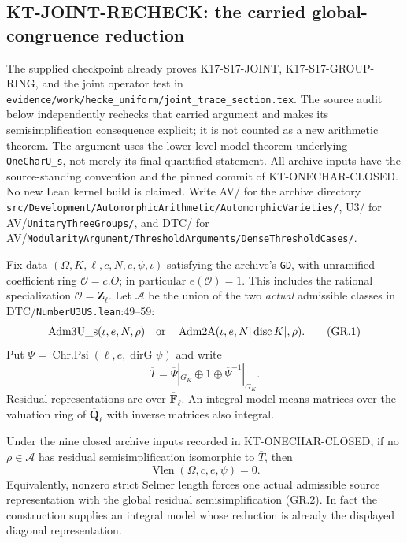 \subsection{KT-JOINT-RECHECK: the carried global-congruence reduction}
\label{sec:kt-global-residual}

The supplied checkpoint already proves K17-S17-JOINT,
K17-S17-GROUP-RING, and the joint operator test in
\texttt{evidence/work/hecke\_uniform/joint\_trace\_section.tex}.
The source audit below independently rechecks that carried
argument and makes its semisimplification consequence explicit;
it is not counted as a new arithmetic theorem. The argument
uses the lower-level model theorem underlying
\texttt{OneCharU\_s}, not merely its final quantified statement.
All archive inputs have the source-standing convention and the
pinned commit of KT-ONECHAR-CLOSED. No new Lean kernel build is
claimed. Write AV/ for the archive directory
\texttt{src/Development/AutomorphicArithmetic/AutomorphicVarieties/},
U3/ for AV/\texttt{UnitaryThreeGroups/}, and DTC/ for
AV/\texttt{ModularityArgument/ThresholdArguments/DenseThresholdCases/}.

Fix data $(\Omega,K,\ell,c,N,e,\psi,\iota)$ satisfying the
archive's \texttt{GD}, with unramified coefficient ring
$\mathcal O=c.O$; in particular $e(\mathcal O)=1$.
This includes the rational specialization $\mathcal O=\mathbf Z_\ell$.
Let $\mathscr A$ be the union of the two \emph{actual} admissible
classes in DTC/\texttt{NumberU3US.lean}:49--59:
\[
 \operatorname{Adm3U\_s}(\iota,e,N,\rho)
 \quad\hbox{or}\quad
 \operatorname{Adm2A}(\iota,e,N|\operatorname{disc}K|,\rho).
                                                               \tag{GR.1}
\]
Put $\Psi=\operatorname{Chr.Psi}(\ell,e,\operatorname{dirG}\psi)$
and write
\[
 \overline T=\overline\Psi|_{G_K}\oplus1
                    \oplus\overline\Psi^{-1}|_{G_K}.
                                                               \tag{GR.2}
\]
Residual representations are over $\overline{\mathbf F}_\ell$.
An integral model means matrices over the valuation ring of
$\overline{\mathbf Q}_\ell$ with inverse matrices also integral.

\begin{theorem}
Under the nine closed archive inputs recorded in
KT-ONECHAR-CLOSED, if no $\rho\in\mathscr A$ has residual
semisimplification isomorphic to $\overline T$, then
\[
                   \operatorname{Vlen}(\Omega,c,e,\psi)=0.
                                                               \tag{GR.3}
\]
Equivalently, nonzero strict Selmer length forces one actual
admissible source representation with the global residual
semisimplification (GR.2). In fact the construction supplies
an integral model whose reduction is already the displayed
diagonal representation.
\end{theorem}

